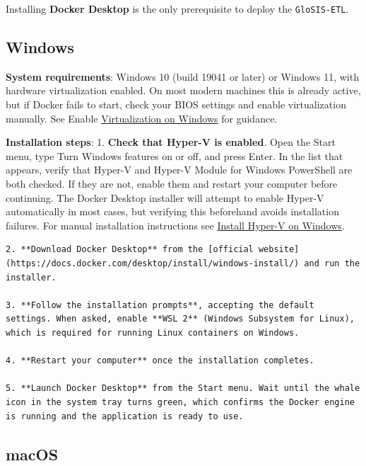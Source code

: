 \documentclass[
  10pt,
  b5paper,
  oneside]{book}
\begin{document}
Installing \textbf{Docker Desktop} is the only prerequisite to deploy the \texttt{GloSIS-ETL}.

\subsection{Windows}\label{windows-1}

\textbf{System requirements}: Windows 10 (build 19041 or later) or Windows 11, with hardware virtualization enabled. On most modern machines this is already active, but if Docker fails to start, check your BIOS settings and enable virtualization manually. See Enable \href{https://support.microsoft.com/en-gb/windows/enable-virtualization-on-windows-c5578302-6e43-4b4b-a449-8ced115f58e1}{Virtualization on Windows} for guidance.

\textbf{Installation steps}:
1. \textbf{Check that Hyper-V is enabled}. Open the Start menu, type Turn Windows features on or off, and press Enter. In the list that appears, verify that Hyper-V and Hyper-V Module for Windows PowerShell are both checked. If they are not, enable them and restart your computer before continuing. The Docker Desktop installer will attempt to enable Hyper-V automatically in most cases, but verifying this beforehand avoids installation failures. For manual installation instructions see \href{https://learn.microsoft.com/en-us/windows-server/virtualization/hyper-v/get-started/Install-Hyper-V}{Install Hyper-V on Windows}.

\begin{verbatim}
2. **Download Docker Desktop** from the [official website](https://docs.docker.com/desktop/install/windows-install/) and run the installer. 

3. **Follow the installation prompts**, accepting the default settings. When asked, enable **WSL 2** (Windows Subsystem for Linux), which is required for running Linux containers on Windows. 

4. **Restart your computer** once the installation completes. 

5. **Launch Docker Desktop** from the Start menu. Wait until the whale icon in the system tray turns green, which confirms the Docker engine is running and the application is ready to use.
\end{verbatim}

\subsection{macOS}\label{macos}
\end{document}
